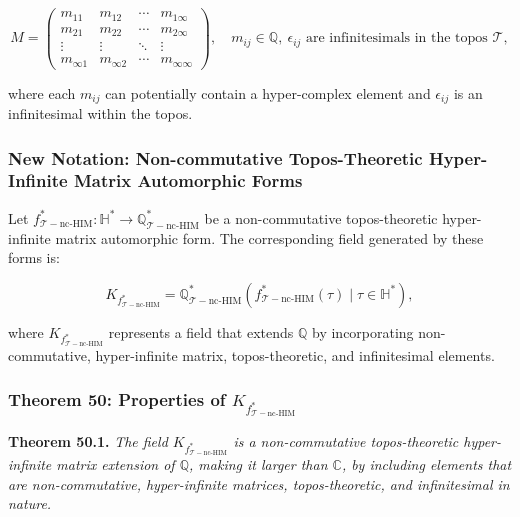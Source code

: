 \documentclass{article}
\begin{document}
\[
M = \begin{pmatrix}
m_{11} & m_{12} & \cdots & m_{1\infty} \\
m_{21} & m_{22} & \cdots & m_{2\infty} \\
\vdots & \vdots & \ddots & \vdots \\
m_{\infty 1} & m_{\infty 2} & \cdots & m_{\infty \infty}
\end{pmatrix}, \quad m_{ij} \in \mathbb{Q}, \ \epsilon_{ij} \text{ are infinitesimals in the topos } \mathcal{T}, 
\]

where each \(m_{ij}\) can potentially contain a hyper-complex element and \(\epsilon_{ij}\) is an infinitesimal within the topos.

\subsubsection{New Notation: Non-commutative Topos-Theoretic Hyper-Infinite Matrix Automorphic Forms}
Let \(f_{\mathcal{T}-\text{nc-HIM}}^*: \mathbb{H}^* \to \mathbb{Q}_{\mathcal{T}-\text{nc-HIM}}^*\) be a non-commutative topos-theoretic hyper-infinite matrix automorphic form. The corresponding field generated by these forms is:

\[
K_{f_{\mathcal{T}-\text{nc-HIM}}^*} = \mathbb{Q}_{\mathcal{T}-\text{nc-HIM}}^*(f_{\mathcal{T}-\text{nc-HIM}}^*(\tau) \mid \tau \in \mathbb{H}^*),
\]

where \(K_{f_{\mathcal{T}-\text{nc-HIM}}^*}\) represents a field that extends \(\mathbb{Q}\) by incorporating non-commutative, hyper-infinite matrix, topos-theoretic, and infinitesimal elements.

\subsubsection{Theorem 50: Properties of \(K_{f_{\mathcal{T}-\text{nc-HIM}}^*}\)}
\textbf{Theorem 50.1.} \textit{The field \(K_{f_{\mathcal{T}-\text{nc-HIM}}^*}\) is a non-commutative topos-theoretic hyper-infinite matrix extension of \(\mathbb{Q}\), making it larger than \(\mathbb{C}\), by including elements that are non-commutative, hyper-infinite matrices, topos-theoretic, and infinitesimal in nature.}
\end{document}
